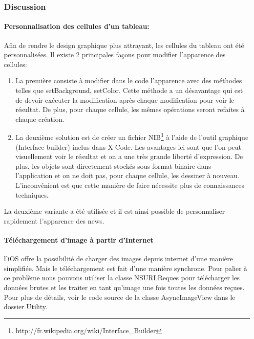			\subsubsection*{Discussion}
			
			
			\paragraph{Personnalisation des cellules d'un tableau:}Afin de rendre le design graphique plus attrayant, les cellules du tableau  ont été personnalisées. Il existe 2 principales façons pour modifier l'apparence des cellules:
		 	\begin{enumerate}
		 	\item La première consiste à modifier dans le code l'apparence avec des méthodes telles que setBackground, setColor. Cette méthode a un désavantage qui est de devoir exécuter la modification après chaque modification pour voir le résultat. De plus, pour chaque cellule, les mêmes opérations seront refaites à chaque création.
		 	\item La deuxième solution est de créer un fichier NIB\footnote{http://fr.wikipedia.org/wiki/Interface\_Builder} à l'aide de l'outil graphique (Interface builder) inclus dans X-Code. Les avantages ici sont que l'on peut visuellement voir le résultat et on a une très grande liberté d'expression. De plus, les objets sont directement stockés sous format binaire dans l'application et on ne doit pas, pour chaque cellule, les dessiner à nouveau. L'inconvénient est que cette manière de faire nécessite plus de connaissances techniques. 
		 	\end{enumerate}
			La deuxième variante a été utilisée et il est ainsi possible de personnaliser rapidement l'apparence des news.
			
			\paragraph{Téléchargement d'image à partir d'Internet} l'iOS offre la possibilité de charger des images depuis internet d'une manière simplifiée. Mais le téléchargement est fait d'une manière synchrone. Pour palier à ce problème nous pouvons utiliser la classe NSURLReques pour télécharger les données brutes et les traiter en tant qu'image une fois toutes les données reçues. Pour plus de détails, voir le code source de la classe AsyncImageView dans le dossier Utility. 
			
